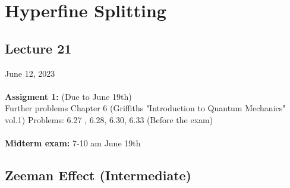 \documentclass[12pt,fancychapters]{report}
\numberwithin{equation}{section}
\begin{document}
\newpage
\chapter{Hyperfine Splitting}
\section{Lecture 21}
June 12, 2023\\
\\
\textbf{Assigment 1:} (Due to June 19th)\\
Further problems Chapter 6 (Griffiths  "Introduction to Quantum Mechanics" vol.1) Problems: 6.27
, 6.28, 6.30, 6.33 (Before the exam)\\
\\
\textbf{Midterm exam: }7-10 am June 19th 

\section{Zeeman Effect (Intermediate)}










































\newpage
\end{document}
